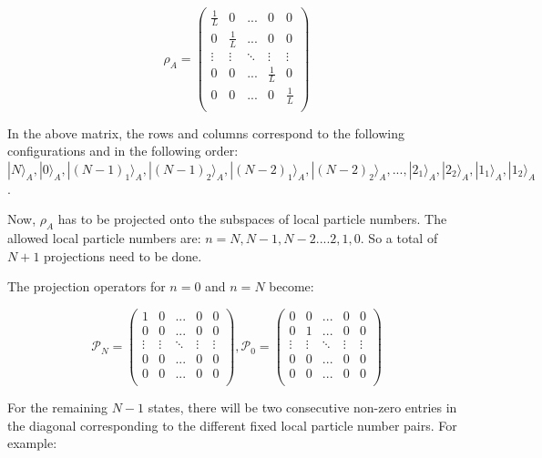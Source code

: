 \begin{equation}
\rho_{A} = \begin{pmatrix}
\frac{1}{L} & 0 &... & 0 & 0 \\
0 & \frac{1}{L} & ... & 0 & 0 \\
\vdots & \vdots & \ddots & \vdots & \vdots \\
0 & 0 & ... & \frac{1}{L} & 0 \\
0 & 0 & ... & 0 & \frac{1}{L} \\
\end{pmatrix}
\end{equation}

In the above matrix, the rows and columns correspond to the following configurations and in the following order: $| N \rangle_{A} , |0 \rangle_{A} , | (N-1)_1 \rangle_{A}, |(N-1)_2 \rangle_{A} , | (N-2)_1 \rangle_{A} , | (N-2)_2 \rangle_{A} , ... , |2_1 \rangle_{A} , |2_2 \rangle_{A} , |1_1 \rangle_{A} , |1_2 \rangle_{A} $.

Now, $\rho_{A}$ has to be projected onto the subspaces of local particle numbers. The allowed local particle numbers are: $n = N, N-1, N-2 .... 2, 1, 0$. So a total of $N+1$ projections need to be done.

The projection operators for $n=0$ and $n=N$ become:

\begin{equation}
\mathcal{P}_{N} = \begin{pmatrix} 
1 & 0 &... & 0 & 0 \\
0 & 0 & ... & 0 & 0 \\
\vdots & \vdots & \ddots & \vdots & \vdots \\
0 & 0 & ... & 0 & 0 \\
0 & 0 & ... & 0 & 0 \\
\end{pmatrix} , 
\mathcal{P}_{0} = \begin{pmatrix} 
0 & 0 &... & 0 & 0 \\
0 & 1 & ... & 0 & 0 \\
\vdots & \vdots & \ddots & \vdots & \vdots \\
0 & 0 & ... & 0 & 0 \\
0 & 0 & ... & 0 & 0 \\
\end{pmatrix}
\end{equation}

For the remaining $N - 1$ states, there will be two consecutive non-zero entries in the diagonal corresponding to the different fixed local particle number pairs. For example:

